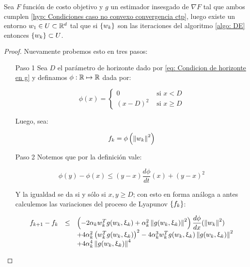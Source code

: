 \begin{theorem}
	\label{theorem: Acotaci\'on global del algoritmo estoc\'astico insesgado}
	Sea $F$ funci\'on de costo objetivo y $g$ un estimador insesgado de $\nabla F$ tal que ambos cumplen \ref{hyp: Condiciones caso no convexo convergencia ctp}, luego existe un entorno $w_1 \in U \subset {\mathbb{R}}^d$ tal que si $\left\lbrace w_k\right\rbrace$ son las iteraciones del algoritmo \ref{algo: DE} entonces $\left\lbrace w_k\right\rbrace \subset U$.
\end{theorem}

\begin{proof}
	Nuevamente probemos esto en tres pasos:
	
	\begin{enumerate}
		\item [Paso 1] Sea $D$ el par\'ametro de horizonte dado por \ref{eq: Condicion de horizonte en g} y definamos $\phi: {\mathbb{R}} \mapsto {\mathbb{R}}$ dada por:
		
		\begin{equation*}
		\phi(x) = \left\lbrace
		\begin{array}{cc}
		 0 & \text{ si } x < D \\
		 (x - D)^2 & \text{ si } x \geq D
		\end{array}\right.
		\end{equation*}
		
		Luego, sea:
		
		\begin{equation*}
			f_k = \phi\left(\left\lVert w_k\right\rVert^2\right)
		\end{equation*}
		
		\item [Paso 2] Notemos que por la definici\'on vale:
		
		\begin{equation*}
			\phi(y) - \phi(x) \leq \left(y - x\right) \dfrac{d \phi}{dt}(x) + (y-x)^2
		\end{equation*}
		
		Y la igualdad se da si y s\'olo si $x,y \geq D$; con esto en forma an\'aloga a antes calculemos las variaciones del proceso de Lyapunov $\left\lbrace f_k\right\rbrace$:
		
		\begin{equation}
		\label{eq: Condicion de proceso de lyapunov, confinamiento global}
		\begin{array}{rcl}
			f_{k+1} - f_k & \leq & \left(-2 \alpha_k w_k^Tg(w_k, \upxi_{k}) + \alpha_k^2 \left\lVert g(w_k, \upxi_{k})\right\rVert^2\right) \dfrac{d \phi}{dx}(\left\lVert w_k\right\rVert^2) \\ 
			& & + 4 \alpha_k^2 \left(w_k^T g(w_k, \upxi_{k})\right)^2 -4 \alpha_k^3 w_k^Tg(w_k, \upxi_{k}) \left\lVert g(w_k, \upxi_{k}) \right\rVert^2 \\
			 & &  + 4 \alpha_k^4 \left\lVert g(w_k, \upxi_{k})\right\rVert^4 \\
		\end{array}
		\end{equation}
		

\end{enumerate}
\end{proof}
